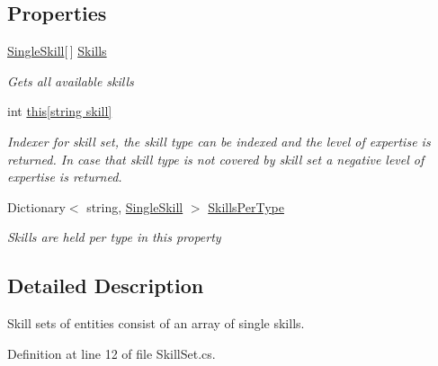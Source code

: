 \subsection*{Properties}
\begin{DoxyCompactItemize}
\item 
\hyperlink{class_simulation_core_1_1_h_c_c_m_elements_1_1_single_skill}{Single\+Skill}\mbox{[}$\,$\mbox{]} \hyperlink{class_simulation_core_1_1_h_c_c_m_elements_1_1_skill_set_af49053d07f626a43f6bf39b3968211ee}{Skills}
\begin{DoxyCompactList}\small\item\em Gets all available skills \end{DoxyCompactList}\item 
int \hyperlink{class_simulation_core_1_1_h_c_c_m_elements_1_1_skill_set_a120e0c79992eff5982844b8180c1db1b}{this\mbox{[}string skill\mbox{]}}
\begin{DoxyCompactList}\small\item\em Indexer for skill set, the skill type can be indexed and the level of expertise is returned. In case that skill type is not covered by skill set a negative level of expertise is returned. \end{DoxyCompactList}\item 
Dictionary$<$ string, \hyperlink{class_simulation_core_1_1_h_c_c_m_elements_1_1_single_skill}{Single\+Skill} $>$ \hyperlink{class_simulation_core_1_1_h_c_c_m_elements_1_1_skill_set_a3f5bc6adc8bfa59b5a7c1d4ffbfcbad6}{Skills\+Per\+Type}
\begin{DoxyCompactList}\small\item\em Skills are held per type in this property \end{DoxyCompactList}\end{DoxyCompactItemize}


\subsection{Detailed Description}
Skill sets of entities consist of an array of single skills. 



Definition at line 12 of file Skill\+Set.\+cs.



